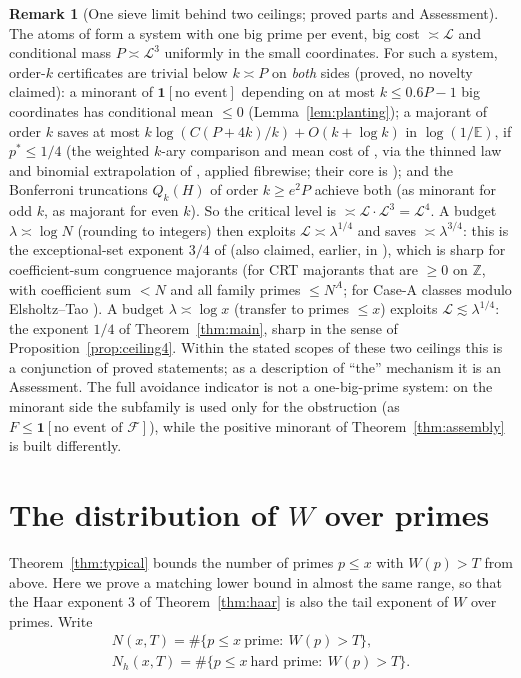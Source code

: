 \documentclass[11pt,reqno]{amsart}
\theoremstyle{definition}
\newtheorem{remark}[theorem]{Remark}
\newcommand{\Lc}{\mathcal L}
\newcommand{\E}{\mathbb E}
\begin{document}
\begin{remark}[One sieve limit behind two ceilings; proved parts and Assessment]\label{rem:unified}
The atoms of \cite{TQ} form a system with one big prime per event, big
cost $\asymp\Lc$ and conditional mass $P\asymp\Lc^3$ uniformly in the small
coordinates.  For such a system, order-$k$ certificates are trivial below
$k\asymp P$ on \emph{both} sides (proved, no novelty claimed): a minorant of
$\mathbf 1[\text{no event}]$ depending on at most $k\le0.6P-1$ big coordinates has
conditional mean $\le0$ (Lemma~\ref{lem:planting}); a majorant of order $k$ saves
at most $k\log(C(P+4k)/k)+O(k+\log k)$ in $\log(1/\E)$, if $p^*\le1/4$ (the weighted
$k$-ary comparison and mean cost of \cite[Thm.~8.5 and Cor.~8.6]{SL}, via the
thinned law and binomial extrapolation of \cite[Lemmas~8.3--8.4]{SL}, applied
fibrewise; their core is \cite{PYY,BGP}); and the Bonferroni truncations
$Q_k(H)$ of order $k\ge e^2P$ achieve both (as minorant for odd $k$, as majorant
for even $k$).  So the critical level is $\asymp\Lc\cdot\Lc^3=\Lc^4$.  A budget
$\lambda\asymp\log N$ (rounding to integers) then exploits $\Lc\asymp\lambda^{1/4}$ and saves
$\asymp\lambda^{3/4}$: this is the exceptional-set exponent $3/4$ of \cite{TQ} (also claimed,
earlier, in \cite{KRK}), which is
sharp for coefficient-sum congruence majorants \cite[Thm.~10.14]{SL} (for CRT
majorants that are $\ge0$ on $\mathbb Z$, with coefficient sum $<N$ and all family primes
$\le N^A$; for Case-A classes modulo Elsholtz--Tao \cite[\S7]{ET}).  A
budget $\lambda\asymp\log x$ (transfer to primes $\le x$) exploits $\Lc\lesssim\lambda^{1/4}$:
the exponent $1/4$ of Theorem~\ref{thm:main}, sharp in the sense of
Proposition~\ref{prop:ceiling4}.  Within the stated scopes of these two
ceilings this is a conjunction of proved statements; as a description of
``the'' mechanism it is an Assessment.  The full avoidance indicator is not
a one-big-prime system: on the minorant side the subfamily is used only
for the obstruction (as $F\le\mathbf 1[\text{no event of }\mathcal F]$), while the positive
minorant of Theorem~\ref{thm:assembly} is built differently.
\end{remark}

\section{The distribution of \texorpdfstring{$W$}{W} over primes}\label{sec:tail}

Theorem~\ref{thm:typical} bounds the number of primes $p\le x$ with $W(p)>T$
from above.  Here we prove a matching lower bound in almost the same range,
so that the Haar exponent $3$ of Theorem~\ref{thm:haar} is also the tail
exponent of $W$ over primes.  Write
\begin{gather*}
 N(x,T)=\#\{p\le x\ \text{prime}:\ W(p)>T\},\\
 N_h(x,T)=\#\{p\le x\ \text{hard prime}:\ W(p)>T\}.
\end{gather*}
\end{document}
